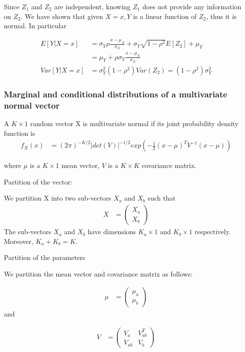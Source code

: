 \documentclass[11pt]{article} %
\begin{document}
Since $Z_1$ and $Z_2$ are independent, knowing $Z_1$ does not provide any information on $Z_2$. We have shown that given $X=x, Y$ is a linear function of $Z_2$, thus it is normal. In particular

\begin{align*}
	E[Y|X=x] &= \sigma_Y \rho \frac{x- \mu_X}{\sigma_X} + \sigma_Y \sqrt{1- \rho^2} E[Z_2] + \mu_Y  \\
	 &= \mu_Y + \rho \sigma_Y \frac{x-\mu_X}{\sigma_X} \\
	Var[Y|X=x] &= \sigma_Y^2 (1- \rho^2) Var(Z_2) = (1- \rho^2) \sigma_Y^2
\end{align*}

\subsubsection{Marginal and conditional distributions of a multivariate normal vector}

A $K \times 1$ random vector X is multivariate normal if its joint probability density function is 
\begin{align*}
	f_X(x) &= (2\pi)^{-K/2} |det(V)|^{-1/2} exp(-\frac{1}{2} (x-\mu)^T V^{-1}(x-\mu)) 
\end{align*}

where $\mu$ is a $K \times 1$ mean vector, $V$ is a $K \times K$ covariance matrix.

Partition of the vector:

 We partition X into two sub-vectors $X_a$ and $X_b$ such that
\begin{align*}
	X &= \begin{pmatrix}
		X_a \\
		X_b
	\end{pmatrix}
\end{align*}
The sub-vectors $X_a$ and $X_b$ have dimensions $K_a \times 1$ and $K_b \times 1$ respectively. Moreover, $K_a + K_b = K$.

Partition of the parameters

We partition the mean vector and covariance matrix as follows:

\begin{align*}
	\mu &= \begin{pmatrix}
		\mu_a \\
		\mu_b
	\end{pmatrix}
\end{align*}
and 

\begin{align*}
	V &= \begin{pmatrix}
		V_a & V_{ab}^T \\
		V_{ab} & V_b
	\end{pmatrix}
\end{align*}
\end{document}
